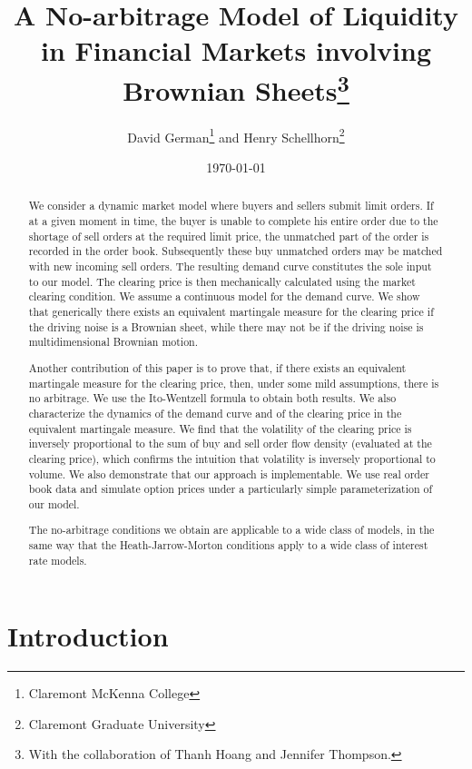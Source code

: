 \documentclass{article}
\begin{document}
\title{A No-arbitrage Model of Liquidity in Financial Markets involving
Brownian Sheets\thanks{%
With the collaboration of Thanh Hoang and Jennifer Thompson.}}
\author{David German\thanks{%
Claremont McKenna College} and Henry Schellhorn\thanks{%
Claremont Graduate University}}
\date{\today }
\maketitle

\begin{abstract}
We consider a dynamic market model where buyers and sellers submit limit
orders. If at a given moment in time, the buyer is unable to complete his
entire order due to the shortage of sell orders at the required limit price,
the unmatched part of the order is recorded in the order book. Subsequently
these buy unmatched orders may be matched with new incoming sell orders. The
resulting demand curve constitutes the sole input to our model. The clearing
price is then mechanically calculated using the market clearing condition.
We assume a continuous model for the demand curve. We show that generically
there exists an equivalent martingale measure for the clearing price if the
driving noise is a Brownian sheet, while there may not be if the driving
noise is multidimensional Brownian motion.

Another contribution of this paper is to prove that, if there exists an
equivalent martingale measure for the clearing price, then, under some mild
assumptions, there is no arbitrage. We use the Ito-Wentzell formula to
obtain both results. We also characterize the dynamics of the demand curve
and of the clearing price in the equivalent martingale measure. We find that
the volatility of the clearing price is inversely proportional to the sum of
buy and sell order flow density (evaluated at the clearing price), which
confirms the intuition that volatility is inversely proportional to volume.
We also demonstrate that our approach is implementable. We use real order
book data and simulate option prices under a particularly simple
parameterization of our model.

The no-arbitrage conditions we obtain are applicable to a wide class of
models, in the same way that the Heath-Jarrow-Morton conditions apply to a
wide class of interest rate models.
\end{abstract}

\section{Introduction}
\end{document}
